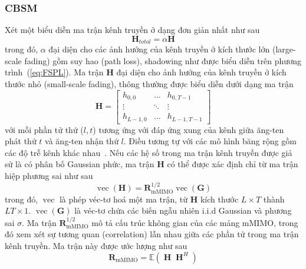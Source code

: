 \subsubsection{CBSM}

Xét một biểu diễn ma trận kênh truyền ở dạng đơn giản nhất như sau
\begin{equation}
    \label{eq:unstructure}
    \mathbf{H}_{total} = \alpha \mathbf{H} 
\end{equation}
trong đó, $\alpha$ đại diện cho các ảnh hưởng của kênh truyền ở kích thước lớn (large-scale fading) gồm suy hao (path loss), shadowing như được biểu diễn trên phương trình~(\ref{eq:FSPL}). Ma trận $\mathbf{H}$ đại diện cho ảnh hưởng của kênh truyền ở kích thước nhỏ (small-scale fading), thông thường được biểu diễn dưới dạng ma trận
\begin{equation}
    \mathbf{H} = \begin{bmatrix}
    h_{0,0} & \ldots  & h_{0, T-1} \\ 
    \vdots & \ddots & \vdots\\ 
    h_{L-1, 0} & \ldots  & h_{L-1, T-1}
    \end{bmatrix}
\end{equation}
với mỗi phần tử thứ ($l, t$) tương ứng với đáp ứng xung của kênh giữa ăng-ten phát thứ $t$ và ăng-ten nhận thứ $l$. Điều tương tự với các mô hình băng rộng gồm các độ trễ kênh khác nhau~\cite{Saleh1987}. Nếu các hệ số trong ma trận kênh truyền được giả sử là có phân bố Gaussian phức, ma trận $\mathbf{H}$ có thể được xác định chỉ từ ma trận hiệp phương sai như sau
\begin{equation}
    \label{eq:correlation}
    \operatorname{vec}(\mathbf{H}) = \mathbf{R}^{1/2}_{\text{mMIMO}} \operatorname{vec} (\mathbf{G})
\end{equation}
trong đó, $\operatorname{vec}$ là phép véc-tơ hoá một ma trận, từ $\mathbf{H}$ kích thước $L\times T$ thành $LT \times 1$. $\operatorname{vec}(\mathbf{G})$ là véc-tơ chứa các biến ngẫu nhiên i.i.d Gaussian và phương sai $\sigma$. Ma trận $\mathbf{R}^{1/2}_{\text{mMIMO}}$ mô tả cấu trúc không gian của các mảng mMIMO, trong đó xem xét sự tương quan (correlation) lẫn nhau giữa các phần tử trong ma trận kênh truyền. Ma trận này được ước lượng như sau
\begin{equation}
    \mathbf{R}_{\text{mMIMO}} = \mathbb{E} ({\operatorname{\mathbf{H}} \operatorname{\mathbf{H}}^H})
\end{equation}
